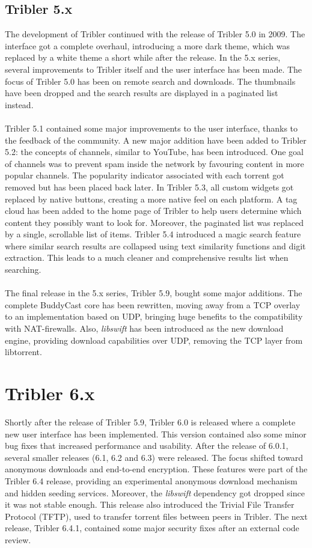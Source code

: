 \subsection{Tribler 5.x}
The development of Tribler continued with the release of Tribler 5.0 in 2009\cite{historyoftribler}. The interface got a complete overhaul, introducing a more dark theme, which was replaced by a white theme a short while after the release. In the 5.x series, several improvements to Tribler itself and the user interface has been made. The focus of Tribler 5.0 has been on remote search and downloads. The thumbnails have been dropped and the search results are displayed in a paginated list instead.\\\\
Tribler 5.1 contained some major improvements to the user interface, thanks to the feedback of the community. A new major addition have been added to Tribler 5.2: the concepts of channels, similar to YouTube, has been introduced. One goal of channels was to prevent spam inside the network by favouring content in more popular channels. The popularity indicator associated with each torrent got removed but has been placed back later. In Tribler 5.3, all custom widgets got replaced by native buttons, creating a more native feel on each platform. A tag cloud has been added to the home page of Tribler to help users determine which content they possibly want to look for. Moreover, the paginated list was replaced by a single, scrollable list of items. Tribler 5.4 introduced a magic search feature where similar search results are collapsed using text similarity functions and digit extraction. This leads to a much cleaner and comprehensive results list when searching.\\\\
The final release in the 5.x series, Tribler 5.9, bought some major additions. The complete BuddyCast core has been rewritten, moving away from a TCP overlay to an implementation based on UDP, bringing huge benefits to the compatibility with NAT-firewalls. Also, \emph{libswift} has been introduced as the new download engine, providing download capabilities over UDP, removing the TCP layer from libtorrent.

\section{Tribler 6.x}
Shortly after the release of Tribler 5.9, Tribler 6.0 is released where a complete new user interface has been implemented. This version contained also some minor bug fixes that increased performance and usability. After the release of 6.0.1, several smaller releases (6.1, 6.2 and 6.3) were released. The focus shifted toward anonymous downloads and end-to-end encryption. These features were part of the Tribler 6.4 release, providing an experimental anonymous download mechanism and hidden seeding services. Moreover, the \emph{libswift} dependency got dropped since it was not stable enough. This release also introduced the Trivial File Transfer Protocol (TFTP), used to transfer torrent files between peers in Tribler. The next release, Tribler 6.4.1, contained some major security fixes after an external code review.

